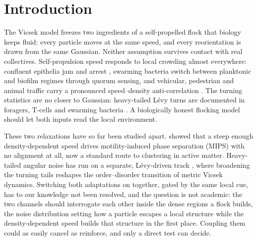 \documentclass[aps,prresearch,preprint,amsmath,amssymb,nofootinbib,superscriptaddress]{revtex4-2}
\begin{document}
\maketitle

\section{Introduction}

The Vicsek model \citep{Vicsek1995} freezes two ingredients of
a self-propelled flock that biology keeps fluid: every particle
moves at the same speed, and every reorientation is drawn from
the same Gaussian. Neither assumption survives contact with
real collectives. Self-propulsion speed responds to local
crowding almost everywhere: confluent epithelia
jam and arrest \citep{Bi2016}, swarming bacteria switch between
planktonic and biofilm regimes through quorum sensing, and
vehicular, pedestrian and animal traffic carry a pronounced
speed--density anti-correlation \citep{Greenshields, LWR}. The
turning statistics are no closer to Gaussian: heavy-tailed
L\'evy turns are documented in foragers, T-cells and swarming
bacteria \citep{Reynolds2018, Harris2012, Ariel2015}. A
biologically honest flocking model should let both inputs read
the local environment.

These two relaxations have so far been studied apart.
\citet{CatesTailleur2015} showed that a steep enough
density-dependent speed drives motility-induced phase
separation (MIPS) with no alignment at all, now a standard route
to clustering in active matter. Heavy-tailed angular noise has
run on a separate, L\'evy-driven track \citep{Eliazar2003,
Ariel2015}, where broadening the turning tails reshapes the
order--disorder transition of metric Vicsek dynamics. Switching
both adaptations on together, gated by the same local cue, has
to our knowledge not been resolved, and the question is not
academic: the two channels should interrogate each other
inside the dense regions a flock builds, the noise
distribution setting how a particle escapes a local structure
while the density-dependent speed builds that structure in the
first place. Coupling them could as easily cancel as reinforce,
and only a direct test can decide.
\end{document}
